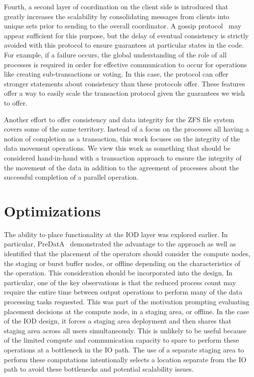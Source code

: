 \documentclass[conference]{sig-alt-gov2}
\begin{document}
Fourth, a second layer of coordination on the client side is introduced that
greatly increases the scalability by consolidating messages from clients into
unique sets prior to sending to the overall coordinator. A gossip
protocol~\cite{ganesh:2003:gossip-protocols} may appear sufficient for this
purpose, but the delay of eventual consistency is strictly avoided with this
protocol to ensure guarantees at particular states in the code. For example, if
a failure occurs, the global understanding of the role of all processes is
required in order for effective communication to occur for operations like
creating sub-transactions or voting. In this case, the protocol can offer
stronger statements about consistency than these protocols offer.  These
features offer a way to easily scale the transaction protocol given the
guarantees we wish to offer.

Another effort to offer consistency and data integrity for the ZFS file
system~\cite{zhang:2010:zfs} covers some of the same territory. Instead of a
focus on the processes all having a notion of completion as a transaction, this
work focuses on the integrity of the data movement operations. We view this
work as something that should be considered hand-in-hand with a transaction
approach to ensure the integrity of the movement of the data in addition to the
agreement of processes about the successful completion of a parallel operation.

\section{Optimizations}
\label{sec:optimizations}

The ability to place functionality at the IOD layer was explored earlier. In
particular, PreDatA~\cite{zheng:2010:predata} demonstrated the advantage to
the approach as well as identified that the placement of the operators should
consider the compute nodes, the staging or burst buffer nodes, or offline
depending on the characteristics of the operation. This consideration should
be incorporated into the design. In particular, one of the key observations
is that the reduced process count may require the entire time between output
operations to perform many of the data processing tasks requested. This was
part of the motivation prompting evaluating placement decisions at the compute
node, in a staging area, or offline. In the case of the IOD design, it forces
a staging area deployment and then shares that staging area across all users
simultaneously. This is unlikely to be useful because of the limited compute
and communication capacity to spare to perform these operations at a bottleneck
in the IO path. The use of a separate staging area to perform these computations
intentionally selects a location separate from the IO path to avoid these
bottlenecks and potential scalability issues.
\end{document}
